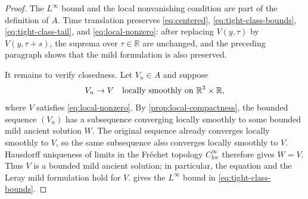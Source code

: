 \documentclass[11pt]{amsart}
\theoremstyle{plain}
\theoremstyle{definition}
\theoremstyle{remark}
\numberwithin{equation}{section}
\begin{document}
\begin{proof}
The \(L^\infty\) bound and the local nonvanishing condition are part of the
definition of \(A\).  Time translation preserves \eqref{eq:centered},
\eqref{eq:tight-class-bounds}, \eqref{eq:tight-class-tail}, and
\eqref{eq:local-nonzero}: after replacing \(V(y,\tau)\) by \(V(y,\tau+s)\), the
suprema over \(\tau\in\mathbb R\) are unchanged, and the preceding paragraph
shows that the mild formulation is also preserved.

It remains to verify closedness.  Let \(V_n\in A\) and suppose
\[
   V_n\to V
   \quad\hbox{locally smoothly on }\mathbb R^3\times\mathbb R,
\]
where \(V\) satisfies \eqref{eq:local-nonzero}.  By
\cref{prop:local-compactness}, the bounded sequence \((V_n)\) has a
subsequence converging locally smoothly to some bounded mild ancient solution
\(W\).  The original sequence already converges locally smoothly to \(V\), so
the same subsequence also converges locally smoothly to \(V\).  Hausdorff
uniqueness of limits in the Fréchet topology \(C^\infty_{\mathrm{loc}}\)
therefore gives \(W=V\).  Thus \(V\) is a bounded mild ancient solution; in
particular, the equation and the Leray mild formulation hold for \(V\).
 gives the \(L^\infty\) bound in
\eqref{eq:tight-class-bounds}.


\end{proof}
\end{document}
